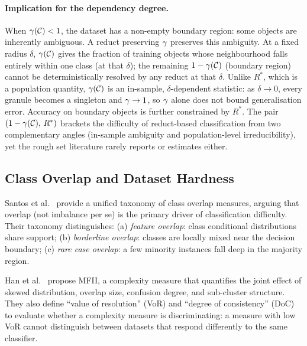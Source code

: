 \paragraph{Implication for the dependency degree.}
When $\gamma(\mathcal{C}) < 1$, the dataset has a non-empty boundary region: some
objects are inherently ambiguous.  A reduct preserving $\gamma$ preserves
this ambiguity.  At a fixed radius $\delta$, $\gamma(\mathcal{C})$ gives the fraction of training objects
whose neighbourhood falls entirely within one class (at that $\delta$); the remaining
$1-\gamma(\mathcal{C})$ (boundary region) cannot be deterministically resolved by any
reduct at that $\delta$.  Unlike $R^*$, which is a population quantity,
$\gamma(\mathcal{C})$ is an in-sample, $\delta$-dependent statistic: as $\delta\to 0$,
every granule becomes a singleton and $\gamma \to 1$, so $\gamma$ alone does not
bound generalisation error.  Accuracy on boundary objects is further
constrained by $R^*$.  The pair $(1-\gamma(\mathcal{C}),\,R^*)$ brackets the difficulty
of reduct-based classification from two complementary angles (in-sample
ambiguity and population-level irreducibility), yet the rough set literature
rarely reports or estimates either.

\subsection{Class Overlap and Dataset Hardness}
\label{sec:overlap}

Santos et al.~\cite{Santos2022overlap} provide a unified taxonomy of class
overlap measures, arguing that overlap (not imbalance per se) is the primary
driver of classification difficulty.  Their taxonomy distinguishes:
(a) \emph{feature overlap}: class conditional distributions share support;
(b) \emph{borderline overlap}: classes are locally mixed near the decision
boundary; (c) \emph{rare case overlap}: a few minority instances fall deep
in the majority region.

Han et al.~\cite{Han2024MFII} propose MFII, a complexity measure that
quantifies the joint effect of skewed distribution, overlap size, confusion
degree, and sub-cluster structure.  They also define ``value of
resolution'' (VoR) and ``degree of consistency'' (DoC) to evaluate whether
a complexity measure is discriminating: a measure with low VoR cannot
distinguish between datasets that respond differently to the same classifier.

